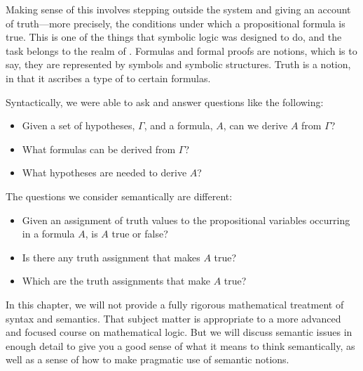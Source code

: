 \documentclass[letterpaper,10pt,english]{sphinxmanual}
\begin{document}
\sphinxAtStartPar
Making sense of this involves stepping outside the system and giving an account of truth—more precisely, the conditions under which a propositional formula is true. This is one of the things that symbolic logic was designed to do, and the task belongs to the realm of . Formulas and formal proofs are  notions, which is to say, they are represented by symbols and symbolic structures. Truth is a  notion, in that it ascribes a type of  to certain formulas.

\sphinxAtStartPar
Syntactically, we were able to ask and answer questions like the following:
\begin{itemize}
\item {} 
\sphinxAtStartPar
Given a set of hypotheses, \(\Gamma\), and a formula, \(A\), can we derive \(A\) from \(\Gamma\)?

\item {} 
\sphinxAtStartPar
What formulas can be derived from \(\Gamma\)?

\item {} 
\sphinxAtStartPar
What hypotheses are needed to derive \(A\)?

\end{itemize}

\sphinxAtStartPar
The questions we consider semantically are different:
\begin{itemize}
\item {} 
\sphinxAtStartPar
Given an assignment of truth values to the propositional variables occurring in a formula \(A\), is \(A\) true or false?

\item {} 
\sphinxAtStartPar
Is there any truth assignment that makes \(A\) true?

\item {} 
\sphinxAtStartPar
Which are the truth assignments that make \(A\) true?

\end{itemize}

\sphinxAtStartPar
In this chapter, we will not provide a fully rigorous mathematical treatment of syntax and semantics. That subject matter is appropriate to a more advanced and focused course on mathematical logic. But we will discuss semantic issues in enough detail to give you a good sense of what it means to think semantically, as well as a sense of how to make pragmatic use of semantic notions.
\end{document}
